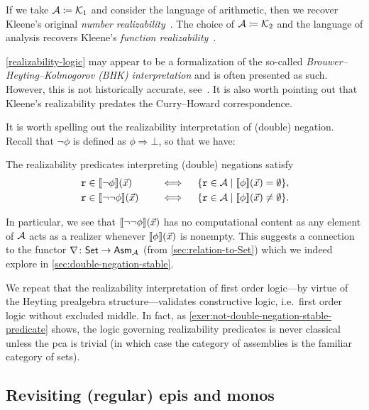 If we take \(\AA \coloneqq \Kone\) and consider the language of arithmetic, then
we recover Kleene's original \emph{number realizability}~\cite{Kleene1945}.
%
The choice of \(\AA \coloneqq \Ktwo\) and the language of analysis recovers
Kleene's \emph{function realizability}~\cite{KleeneVesley1965}.
%

\cref{realizability-logic} may appear to be a formalization of the so-called
\emph{Brouwer--Heyting--Kolmogorov (BHK) interpretation} and is often presented
as such. However, this is not historically accurate,
see~\cite[p.~241]{vanOosten2002}. It is also worth pointing out that Kleene's
realizability predates the Curry--Howard correspondence.


It is worth spelling out the realizability interpretation of (double) negation.
%
Recall that \(\lnot\phi\) is defined as \(\phi \Rightarrow \bot\), so that we
have:
\begin{lemma}%
  The realizability predicates interpreting (double) negations satisfy
  \begin{alignat*}{2}
    &\pca{r} \in \sem{\lnot\phi}(\vec x) &&\quad\iff\quad
    \set{\pca{r} \in \AA \mid \sem{\phi}(\vec x) = \emptyset}, \\
    &\pca{r} \in \sem{\lnot\lnot\phi}(\vec x) &&\quad\iff\quad
    \set{\pca{r} \in \AA \mid \sem{\phi}(\vec x) \neq \emptyset}.
  \end{alignat*}
\end{lemma}

In particular, we see that \(\sem{\lnot\lnot\phi}(\vec x)\) has no computational
content as any element of \(\AA\) acts as a realizer whenever
\(\sem{\phi}(\vec x)\) is nonempty.
%
This suggests a connection to the functor \(\nabla \colon \Set \to \Asm{\AA}\)
(from \cref{sec:relation-to-Set}) which we indeed explore in
\cref{sec:double-negation-stable}.

We repeat that the realizability interpretation of first order logic---by virtue
of the Heyting prealgebra structure---validates constructive logic, i.e.\ first
order logic without excluded middle.
%
In fact, as \cref{exer:not-double-negation-stable-predicate} shows, the logic
governing realizability predicates is never classical unless the pca is
trivial (in which case the category of assemblies is the familiar category of
sets).

\subsection{Revisiting (regular) epis and monos}\label{sec:revisiting-epis-monos}

